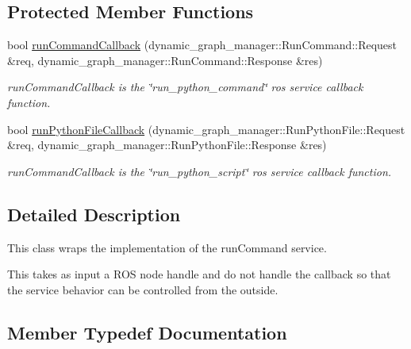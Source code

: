 \subsection*{Protected Member Functions}
\begin{DoxyCompactItemize}
\item 
bool \hyperlink{classdynamic__graph_1_1RosPythonInterpreter_af589eb361f3193c48c7e7f2eb5a3ff64}{run\+Command\+Callback} (dynamic\+\_\+graph\+\_\+manager\+::\+Run\+Command\+::\+Request \&req, dynamic\+\_\+graph\+\_\+manager\+::\+Run\+Command\+::\+Response \&res)
\begin{DoxyCompactList}\small\item\em run\+Command\+Callback is the \char`\"{}run\+\_\+python\+\_\+command\char`\"{} ros service callback function. \end{DoxyCompactList}\item 
bool \hyperlink{classdynamic__graph_1_1RosPythonInterpreter_a519321128872afdcec622a4892c63196}{run\+Python\+File\+Callback} (dynamic\+\_\+graph\+\_\+manager\+::\+Run\+Python\+File\+::\+Request \&req, dynamic\+\_\+graph\+\_\+manager\+::\+Run\+Python\+File\+::\+Response \&res)
\begin{DoxyCompactList}\small\item\em run\+Command\+Callback is the \char`\"{}run\+\_\+python\+\_\+script\char`\"{} ros service callback function. \end{DoxyCompactList}\end{DoxyCompactItemize}


\subsection{Detailed Description}
This class wraps the implementation of the run\+Command service. 

This takes as input a R\+OS node handle and do not handle the callback so that the service behavior can be controlled from the outside. 

\subsection{Member Typedef Documentation}
